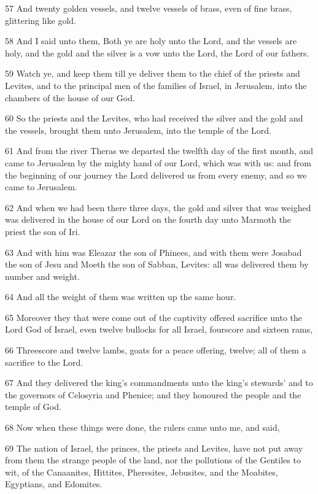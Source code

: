 \par 57 And twenty golden vessels, and twelve vessels of brass, even of fine brass, glittering like gold.
\par 58 And I said unto them, Both ye are holy unto the Lord, and the vessels are holy, and the gold and the silver is a vow unto the Lord, the Lord of our fathers.
\par 59 Watch ye, and keep them till ye deliver them to the chief of the priests and Levites, and to the principal men of the families of Israel, in Jerusalem, into the chambers of the house of our God.
\par 60 So the priests and the Levites, who had received the silver and the gold and the vessels, brought them unto Jerusalem, into the temple of the Lord.
\par 61 And from the river Theras we departed the twelfth day of the first month, and came to Jerusalem by the mighty hand of our Lord, which was with us: and from the beginning of our journey the Lord delivered us from every enemy, and so we came to Jerusalem.
\par 62 And when we had been there three days, the gold and silver that was weighed was delivered in the house of our Lord on the fourth day unto Marmoth the priest the son of Iri.
\par 63 And with him was Eleazar the son of Phinees, and with them were Josabad the son of Jesu and Moeth the son of Sabban, Levites: all was delivered them by number and weight.
\par 64 And all the weight of them was written up the same hour.
\par 65 Moreover they that were come out of the captivity offered sacrifice unto the Lord God of Israel, even twelve bullocks for all Israel, fourscore and sixteen rams,
\par 66 Threescore and twelve lambs, goats for a peace offering, twelve; all of them a sacrifice to the Lord.
\par 67 And they delivered the king's commandments unto the king's stewards' and to the governors of Celosyria and Phenice; and they honoured the people and the temple of God.
\par 68 Now when these things were done, the rulers came unto me, and said,
\par 69 The nation of Israel, the princes, the priests and Levites, have not put away from them the strange people of the land, nor the pollutions of the Gentiles to wit, of the Canaanites, Hittites, Pheresites, Jebusites, and the Moabites, Egyptians, and Edomites.
